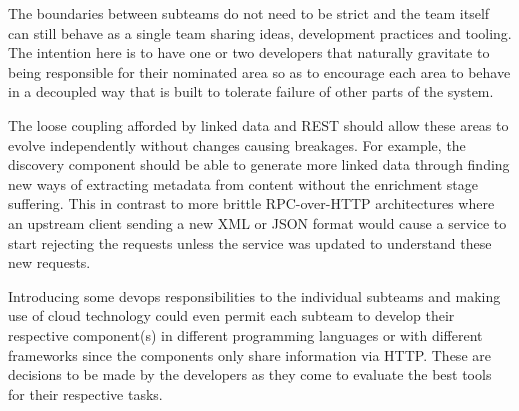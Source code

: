 The boundaries between subteams do not need to be strict and the team
itself can still behave as a single team sharing ideas, development practices
and tooling. The intention here is to have one or two developers that naturally
gravitate to being responsible for their nominated area so as to encourage
each area to behave in a decoupled way that is built to tolerate failure of
other parts of the system.

The loose coupling afforded by linked data and REST should allow these areas
to evolve independently without changes causing breakages. For example, the
discovery component should be able to generate more linked data through finding
new ways of extracting metadata from content without the enrichment stage
suffering. This in contrast to more brittle RPC-over-HTTP architectures where
an upstream client sending a new XML or JSON format would cause a service to
start rejecting the requests unless the service was updated to understand these
new requests.

Introducing some devops\cite{huttermann2012devops}
responsibilities to the individual subteams and
making use of cloud technology could even permit each subteam to
develop their respective component(s) in different programming languages or
with different frameworks since the components only share information
via HTTP. These are decisions to be made by the developers as they come
to evaluate the best tools for their respective tasks.
